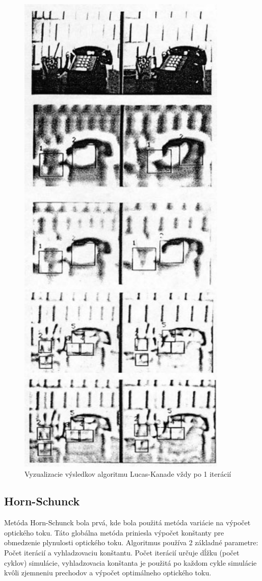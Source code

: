 \begin{figure}[H]
  \centering
  \includegraphics[width=10cm]{pics/lukas-kanade.jpg}
  \caption{Vyzualizacie výsledkov algoritmu Lucas-Kanade vždy po 1 iterácií\cite{lucas-kanade}}
\end{figure}
\vspace{10mm}

\subsection{Horn-Schunck}
Metóda Horn-Schunck bola prvá, kde bola použitá metóda variácie na výpočet optického toku.
Táto globálna metóda priniesla výpočet  konštanty pre obmedzenie plynulosti optického toku.
Algoritmus používa 2 základné parametre: Počet iterácií a vyhladzovaciu konštantu.
Počet iterácií určuje dĺžku (počet cyklov) simulácie, vyhladzovacia konštanta je použitá po každom cykle simulácie kvôli zjemneniu prechodov a výpočet optimálneho optického toku.

